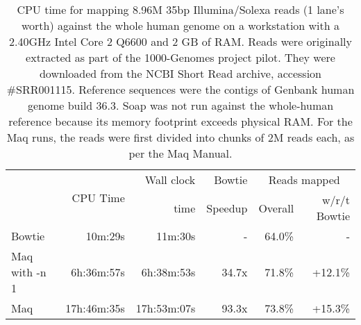 \documentclass[letterpaper]{article}
\begin{document}
\begin{table}[tp]
\scriptsize
\begin{tabular}{lrrrrr}\toprule
 & \multirow{2}{*}{CPU Time} & Wall clock & Bowtie  & \multicolumn{2}{c}{Reads mapped} \\
 &                            & time       & Speedup & Overall    & w/r/t Bowtie \\[3pt]
\toprule
Bowtie & 10m:29s & 11m:30s & - & 64.0\% & - \\\midrule
Maq with -n 1 & 6h:36m:57s & 6h:38m:53s & 34.7x & 71.8\% & +12.1\% \\\midrule
Maq & 17h:46m:35s & 17h:53m:07s & 93.3x & 73.8\% & +15.3\% \\
\bottomrule
\end{tabular}
\caption{CPU time for mapping 8.96M 35bp Illumina/Solexa reads (1 lane's worth) against the whole human genome on a workstation with a 2.40GHz Intel Core 2 Q6600 and 2 GB of RAM. Reads were originally extracted as part of the 1000-Genomes project pilot. They were downloaded from the NCBI Short Read archive, accession \#SRR001115. Reference sequences were the contigs of Genbank human genome build 36.3. Soap was not run against the whole-human reference because its memory footprint exceeds physical RAM. For the Maq runs, the reads were first divided into chunks of 2M reads each, as per the Maq Manual.}
\end{table}
\end{document}
